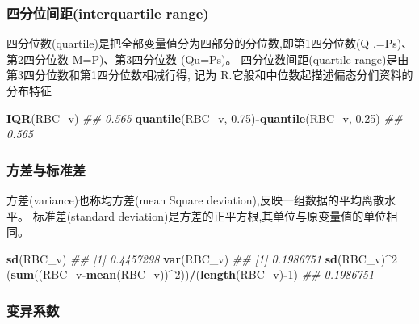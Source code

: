 \documentclass[
]{article}
\newenvironment{Shaded}{\begin{snugshade}}{\end{snugshade}}
\newcommand{\CommentTok}[1]{\textcolor[rgb]{0.56,0.35,0.01}{\textit{#1}}}
\newcommand{\DecValTok}[1]{\textcolor[rgb]{0.00,0.00,0.81}{#1}}
\newcommand{\FloatTok}[1]{\textcolor[rgb]{0.00,0.00,0.81}{#1}}
\newcommand{\KeywordTok}[1]{\textcolor[rgb]{0.13,0.29,0.53}{\textbf{#1}}}
\newcommand{\NormalTok}[1]{#1}
\newcommand{\OperatorTok}[1]{\textcolor[rgb]{0.81,0.36,0.00}{\textbf{#1}}}
\begin{document}
\hypertarget{ux56dbux5206ux4f4dux95f4ux8dddinterquartile-range}{%
\subsubsection{四分位间距(interquartile range)}\label{ux56dbux5206ux4f4dux95f4ux8dddinterquartile-range}}

四分位数(quartile)是把全部变量值分为四部分的分位数,即第1四分位数(Q .=Ps)、第2四分位数 M=P)、第3四分位数 (Qu=Ps)。 四分位数间距(quartile range)是由第3四分位数和第1四分位数相减行得,
记为 R.它般和中位数起描述偏态分们资料的分布特征

\begin{Shaded}
\begin{Highlighting}[]
\KeywordTok{IQR}\NormalTok{(RBC_v)}
\CommentTok{##  0.565}
\KeywordTok{quantile}\NormalTok{(RBC_v, }\FloatTok{0.75}\NormalTok{)}\OperatorTok{-}\KeywordTok{quantile}\NormalTok{(RBC_v, }\FloatTok{0.25}\NormalTok{)}
\CommentTok{## 0.565}
\end{Highlighting}
\end{Shaded}

\hypertarget{ux65b9ux5deeux4e0eux6807ux51c6ux5dee}{%
\subsubsection{方差与标准差}\label{ux65b9ux5deeux4e0eux6807ux51c6ux5dee}}

方差(variance)也称均方差(mean Square deviation),反映一组数据的平均离散水平。
标准差(standard deviation)是方差的正平方根,其单位与原变量值的单位相同。

\begin{Shaded}
\begin{Highlighting}[]
\KeywordTok{sd}\NormalTok{(RBC_v)}
\CommentTok{## [1] 0.4457298}
\KeywordTok{var}\NormalTok{(RBC_v)}
\CommentTok{## [1] 0.1986751}
\KeywordTok{sd}\NormalTok{(RBC_v)}\OperatorTok{^}\DecValTok{2}
\NormalTok{(}\KeywordTok{sum}\NormalTok{((RBC_v}\OperatorTok{-}\KeywordTok{mean}\NormalTok{(RBC_v))}\OperatorTok{^}\DecValTok{2}\NormalTok{))}\OperatorTok{/}\NormalTok{(}\KeywordTok{length}\NormalTok{(RBC_v)}\OperatorTok{-}\DecValTok{1}\NormalTok{)}
\CommentTok{## 0.1986751}
\end{Highlighting}
\end{Shaded}

\hypertarget{ux53d8ux5f02ux7cfbux6570}{%
\subsubsection{变异系数}\label{ux53d8ux5f02ux7cfbux6570}}
\end{document}
